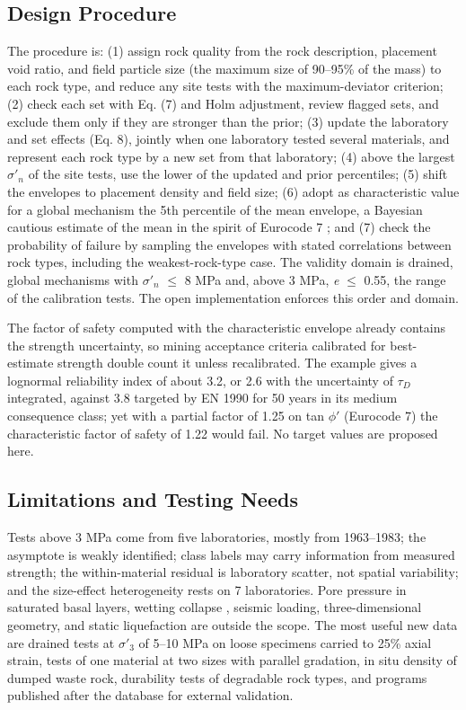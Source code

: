 \documentclass[Journal,letterpaper]{ascelike-new}
\begin{document}
\subsection{Design Procedure}
The procedure is: (1) assign rock quality from the rock description, placement void ratio, and field particle size (the maximum size of 90--95\% of the mass) to each rock type, and reduce any site tests with the maximum-deviator criterion; (2) check each set with Eq. (7) and Holm adjustment, review flagged sets, and exclude them only if they are stronger than the prior; (3) update the laboratory and set effects (Eq. 8), jointly when one laboratory tested several materials, and represent each rock type by a new set from that laboratory; (4) above the largest $\sigma'_n$ of the site tests, use the lower of the updated and prior percentiles; (5) shift the envelopes to placement density and field size; (6) adopt as characteristic value for a global mechanism the 5th percentile of the mean envelope, a Bayesian cautious estimate of the mean \cite{prastings2019} in the spirit of Eurocode 7 \cite{cen2024}; and (7) check the probability of failure by sampling the envelopes with stated correlations between rock types, including the weakest-rock-type case. The validity domain is drained, global mechanisms with $\sigma'_n$ $\le$ 8 MPa and, above 3 MPa, \textit{e} $\le$ 0.55, the range of the calibration tests. The open implementation enforces this order and domain.

The factor of safety computed with the characteristic envelope already contains the strength uncertainty, so mining acceptance criteria calibrated for best-estimate strength \cite{read2009,hawley2017} double count it unless recalibrated. The example gives a lognormal reliability index of about 3.2, or 2.6 with the uncertainty of $\tau_D$ integrated, against 3.8 targeted by EN 1990 \cite{cen2002} for 50 years in its medium consequence class; yet with a partial factor of 1.25 on tan $\phi'$ (Eurocode 7) the characteristic factor of safety of 1.22 would fail. No target values are proposed here.

\subsection{Limitations and Testing Needs}
Tests above 3 MPa come from five laboratories, mostly from 1963--1983; the asymptote is weakly identified; class labels may carry information from measured strength; the within-material residual is laboratory scatter, not spatial variability; and the size-effect heterogeneity rests on 7 laboratories. Pore pressure in saturated basal layers, wetting collapse \cite{oldecop2001}, seismic loading, three-dimensional geometry, and static liquefaction are outside the scope. The most useful new data are drained tests at $\sigma'_3$ of 5--10 MPa on loose specimens carried to 25\% axial strain, tests of one material at two sizes with parallel gradation, in situ density of dumped waste rock, durability tests of degradable rock types, and programs published after the database for external validation.
\end{document}
